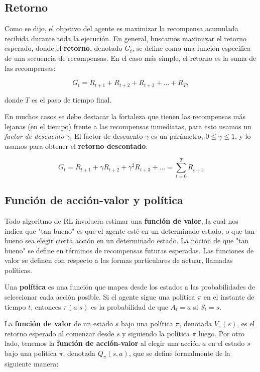 \subsection{Retorno}
Como se dijo, el objetivo del agente es maximizar la recompensa acumulada recibida durante toda la ejecución. En general, buscamos maximizar el retorno esperado, donde el \textbf{retorno}, denotado $G_t$, se define como una función específica de una secuencia de recompensas. En el caso más simple, el retorno es la suma de las recompensas:

\[
G_t = R_{t+1} + R_{t+2} + R_{t+3} + \ldots + R_T,
\]

donde $T$ es el paso de tiempo final.

En muchos casos se debe destacar la fortaleza que tienen las recompensas más lejanas (en el tiempo) frente a las recompensas inmediatas, para esto usamos un \textit{factor de descuento} $\gamma$. El factor de descuento $\gamma$ es un parámetro, $0 \leq \gamma \leq 1$, y lo usamos para obtener el \textbf{retorno descontado}:

\[
G_t = R_{t+1} + \gamma R_{t+2} + \gamma^2 R_{t+3} + \ldots = \sum_{t=0}^{T} R_{t+1}
\]

\subsection{Función de acción-valor y política}
Todo algoritmo de RL involucra estimar una \textbf{función de valor}, la cual nos indica que "tan bueno" es que el agente esté en un determinado estado, o que tan bueno sea elegir cierta acción en un determinado estado. La noción de que "tan bueno" se define en términos de recompensas futuras esperadas. Las funciones de valor se definen con respecto a las formas particulares de actuar, llamadas políticas.

Una \textbf{política} es una función que mapea desde los estados a las probabilidades de seleccionar cada acción posible. Si el agente sigue una política $\pi$ en el instante de tiempo $t$, entonces $\pi(a|s)$ es la probabilidad de que $A_t=a$ si $S_t=s$.

La \textbf{función de valor} de un estado $s$ bajo una política $\pi$, denotada $V_{\pi}(s)$, es el retorno esperado al comenzar desde $s$ y siguiendo la política $\pi$ luego. Por otro lado, tenemos la \textbf{función de acción-valor} al elegir una acción $a$ en el estado $s$ bajo una política $\pi$, denotada \textbf{$Q_{\pi}(s,a)$}, que se define formalmente de la siguiente manera:

